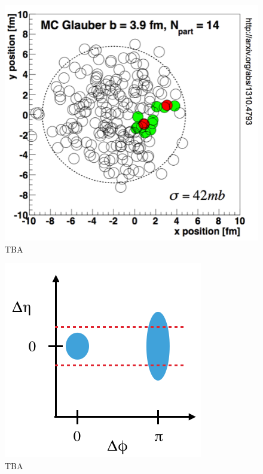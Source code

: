 \begin{figure}
\begin{center}
\includegraphics[width=0.5\linewidth]{figs/glauber_event_display.png}
\caption{TBA}
\label{fig:glauber_event_display}
\end{center}
\end{figure}

\begin{figure}
\begin{center}
\includegraphics[width=0.5\linewidth]{figs/jet_corr_example.png}
\caption{TBA}
\label{fig:jet_corr_example}
\end{center}
\end{figure}


